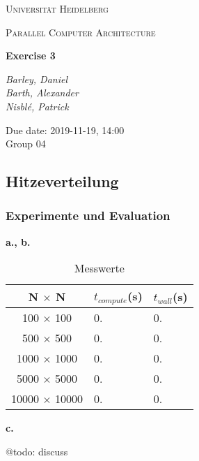 \documentclass[12pt]{article}
\begin{document}
	\begin{titlepage}
		\centering

		{\scshape\LARGE Universität Heidelberg \par}
		\vspace{1cm}
		{\scshape\Large Parallel Computer Architecture \par}
		\vspace{1.5cm}
		{\huge\bfseries Exercise 3\par}
		\vspace{2cm}
		{\Large\itshape Barley, Daniel\\Barth, Alexander\\Nisblé, Patrick\par}
		\vfill
		
		
		{\large Due date: 2019-11-19, 14:00\\Group 04\par}
	\end{titlepage}
\setcounter{section}{3}
\subsection{Hitzeverteilung}

\setcounter{subsubsection}{1}

\subsubsection{Experimente und Evaluation}

\noindent \textbf{a., b.}

\begin{table}[ht]
	\centering
	\caption[Messwerte]{Messwerte}
	\begin{tabular}{c|l|l}
		\hline
		\cellcolor{gray!40}\textbf{N $\times$ N} & \multicolumn{1}{c}{\cellcolor{gray!40}\textbf{$t_{compute}$(\si{\second})}} & \multicolumn{1}{c}{\cellcolor{gray!40}\textbf{$t_{wall}$(\si{\second})}}\\
		\hline\hline
		100 $\times$ 100 & 0. & 0.\\\hline
		500 $\times$ 500 & 0. & 0.\\\hline
		1000 $\times$ 1000 & 0. & 0.\\\hline
		5000 $\times$ 5000 & 0. & 0.\\\hline
		10000 $\times$ 10000 & 0. & 0.\\\hline
	\end{tabular}
	\label{tab:values}
\end{table}

\noindent \textbf{c.}

@todo: discuss
\end{document}
